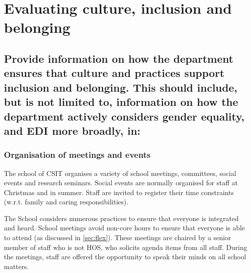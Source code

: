 
\clearpage

\section{Evaluating culture, inclusion and belonging}
\label{sec:culture}

\subsection{Provide information on how the department ensures that culture and practices support inclusion and belonging. This should include, but is not limited to, information on how the department actively considers gender equality, and EDI more broadly, in:} 

\subsubsection{Organisation of meetings and events}
The school of CSIT organises a variety of school meetings, committees, social events and research seminars. %
Social events are normally organised for staff at Christmas and in summer. Staff are invited to register their time constraints  (w.r.t. family and caring responsibilities). 

The School considers numerous practices to ensure that everyone is integrated and heard. School meetings avoid non-core hours to ensure that everyone is able to attend (as discussed in \ref{sec:flex}).
These meetings are chaired by a senior member of staff who is not \ac{HOS}, who solicits agenda items from all staff. 
During the meetings, staff are offered the opportunity to speak their minds on all school matters.

